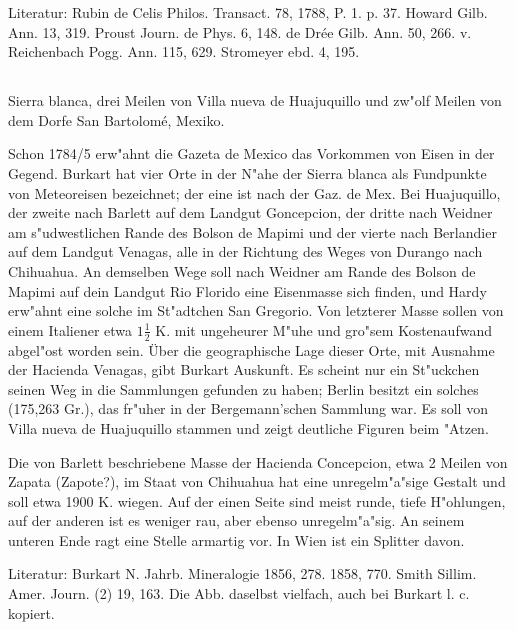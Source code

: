 \documentclass[a4paper, 11pt, oneside]{article}
\begin{document}
\normalsize
Literatur: Rubin de Celis Philos. Transact. 78, 1788, P. 1. p. 37. Howard Gilb. Ann. 13, 319. Proust Journ. de Phys. 6, 148. de Drée Gilb. Ann. 50, 266. v. Reichenbach Pogg. Ann. 115, 629. Stromeyer ebd. 4, 195.

\subsection{}
\LARGE
\paragraph{}
Sierra blanca, drei Meilen von Villa nueva de Huajuquillo und zw"olf Meilen von dem Dorfe San Bartolomé, Mexiko.

Schon 1784/5 erw"ahnt die Gazeta de Mexico das Vorkommen von Eisen in der Gegend. Burkart hat vier Orte in der N"ahe der Sierra blanca als Fundpunkte von Meteoreisen bezeichnet; der eine ist nach der Gaz. de Mex. Bei Huajuquillo, der zweite nach Barlett auf dem Landgut Goncepcion, der dritte nach Weidner am s"udwestlichen Rande des Bolson de Mapimi und der vierte nach Berlandier auf dem Landgut Venagas, alle in der Richtung des Weges von Durango nach Chihuahua. An demselben Wege soll nach Weidner am Rande des Bolson de Mapimi auf dein Landgut Rio Florido eine Eisenmasse sich finden, und Hardy erw"ahnt eine solche im St"adtchen San Gregorio. Von letzterer Masse sollen von einem Italiener etwa $\mathfrak{1\frac{1}{2}}$ K. mit ungeheurer M"uhe und gro"sem Kostenaufwand abgel"ost worden sein. Über die geographische Lage dieser Orte, mit Ausnahme der Hacienda Venagas, gibt Burkart Auskunft. Es scheint nur ein St"uckchen seinen Weg in die Sammlungen gefunden zu haben; Berlin besitzt ein solches (175,263 Gr.), das fr"uher in der Bergemann'schen Sammlung war. Es soll von Villa nueva de Huajuquillo stammen und zeigt deutliche Figuren beim "Atzen.

Die von Barlett beschriebene Masse der Hacienda Concepcion, etwa 2 Meilen von Zapata (Zapote?), im Staat von Chihuahua hat eine unregelm"a"sige Gestalt und soll etwa 1900 K. wiegen. Auf der einen Seite sind meist runde, tiefe H"ohlungen, auf der anderen ist es weniger rau, aber ebenso unregelm"a"sig. An seinem unteren Ende ragt eine Stelle armartig vor. In Wien ist ein Splitter davon.

\normalsize
Literatur: Burkart N. Jahrb. Mineralogie 1856, 278. 1858, 770. Smith Sillim. Amer. Journ. (2) 19, 163. Die Abb. daselbst vielfach, auch bei Burkart l. c. kopiert.
\end{document}
